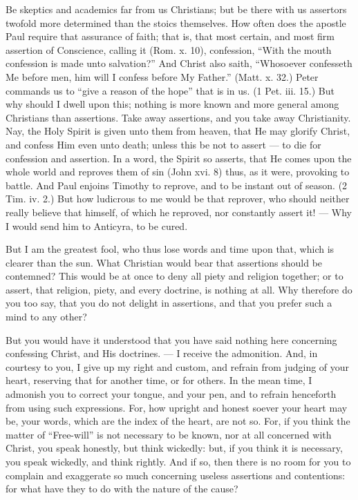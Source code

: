 Be skeptics and academics far from us Christians; but be there with us assertors twofold more determined than the stoics themselves. How often does the apostle Paul require that assurance of faith; that is, that most certain, and most firm assertion of Conscience, calling it (Rom. x. 10), confession, “With the mouth confession is made unto salvation?” And Christ also saith, “Whosoever confesseth Me before men, him will I confess before My Father.” (Matt. x. 32.) Peter commands us to “give a reason of the hope” that is in us. (1 Pet. iii. 15.) But why should I dwell upon this; nothing is more known and more general among Christians than assertions. Take away assertions, and you take away Christianity. Nay, the Holy Spirit is given unto them from heaven, that He may glorify Christ, and confess Him even unto death; unless this be not to assert — to die for confession and assertion. In a word, the Spirit so asserts, that He comes upon the whole world and reproves them of sin (John xvi. 8) thus, as it were, provoking to battle. And Paul enjoins Timothy to reprove, and to be instant out of season. (2 Tim. iv. 2.) But how ludicrous to me would be that reprover, who should neither really believe that himself, of which he reproved, nor constantly assert it! — Why I would send him to Anticyra, to be cured.

But I am the greatest fool, who thus lose words and time upon that, which is clearer than the sun. What Christian would bear that assertions should be contemned? This would be at once to deny all piety and religion together; or to assert, that religion, piety, and every doctrine, is nothing at all. Why therefore do you too say, that you do not delight in assertions, and that you prefer such a mind to any other?

But you would have it understood that you have said nothing here concerning confessing Christ, and His doctrines. — I receive the admonition. And, in courtesy to you, I give up my right and custom, and refrain from judging of your heart, reserving that for another time, or for others. In the mean time, I admonish you to correct your tongue, and your pen, and to refrain henceforth from using such expressions. For, how upright and honest soever your heart may be, your words, which are the index of the heart, are not so. For, if you think the matter of “Free-will” is not necessary to be known, nor at all concerned with Christ, you speak honestly, but think wickedly: but, if you think it is necessary, you speak wickedly, and think rightly. And if so, then there is no room for you to complain and exaggerate so much concerning useless assertions and contentions: for what have they to do with the nature of the cause?

